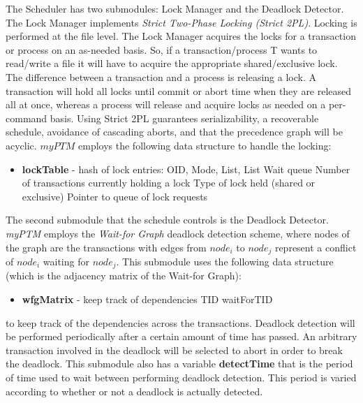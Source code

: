 The Scheduler has two submodules: Lock Manager and the Deadlock Detector. The Lock Manager implements \textit{Strict Two-Phase Locking (Strict 2PL)}. Locking is performed at the file level. The Lock Manager acquires the locks for a transaction or process on an as-needed basis. So, if a transaction/process T wants to read/write a file it will have to acquire the appropriate shared/exclusive lock. \\

The difference between a transaction and a process is releasing a lock. A transaction will hold all locks until commit or abort time when they are released all at once, whereas a process will release and acquire locks as needed on a per-command basis. Using Strict 2PL guarantees serializability, a recoverable schedule, avoidance of cascading aborts, and that the precedence graph will be acyclic. $myPTM$ employs the following data structure to handle the locking:

\begin{itemize}
\item \textbf{lockTable} - hash of lock entries: OID, Mode, List, List Wait queue
\subitem Number of transactions currently holding a lock
\subitem Type of lock held (shared or exclusive)
\subitem Pointer to queue of lock requests
\end{itemize}

The second submodule that the schedule controls is the Deadlock Detector. \textit{myPTM} employs the \textit{Wait-for Graph} deadlock detection scheme, where nodes of the graph are the transactions with edges from $node_i$ to $node_j$ represent a conflict of $node_i$ waiting for $node_j$. This submodule uses the following data structure (which is the adjacency matrix of the Wait-for Graph):

\begin{itemize}
\item \textbf{wfgMatrix} - keep track of dependencies 
\subitem TID
\subitem waitForTID
\end{itemize}

to keep track of the dependencies across the transactions. Deadlock detection will be performed periodically after a certain amount of time has passed. An arbitrary transaction involved in the deadlock will be selected to abort in order to break the deadlock. This submodule also has a variable \textbf{detectTime} that is the period of time used to wait between performing deadlock detection. This period is varied according to whether or not a deadlock is actually detected. \\

